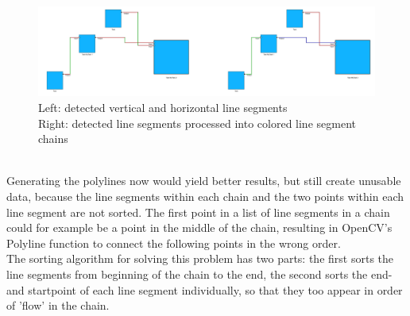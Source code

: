 \begin{figure}[h]
    \centering
    \includegraphics[width=\linewidth]{Pictures/chains_before_after.png}
    \caption{Left: detected vertical and horizontal line segments\\Right: detected line segments processed into colored line segment chains}
    \label{fig_chains_before_after}
\end{figure}\\
Generating the polylines now would yield better results, but still create unusable data, because the line segments within each chain and the two points within each line segment are not sorted. The first point in a list of line segments in a chain could for example be a point in the middle of the chain, resulting in OpenCV's Polyline function to connect the following points in the wrong order.\\
The sorting algorithm for solving this problem has two parts: the first sorts the line segments from beginning of the chain to the end, the second sorts the end- and startpoint of each line segment individually, so that they too appear in order of 'flow' in the chain.

